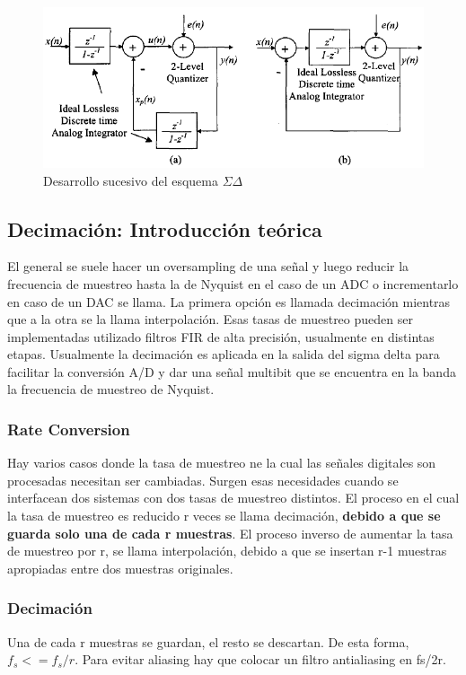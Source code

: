 \documentclass[assd_tp3_main.tex]{subfiles}
\begin{document}
\begin{figure}[H]
\centering
\includegraphics[width=0.6\linewidth]{images/ej4/sd_block_model.png}
\caption{Desarrollo sucesivo del esquema $\Sigma\Delta$ }
\label{fig:sd_block_model}
\end{figure}

\subsection{Decimación: Introducción teórica}
El general se suele hacer un oversampling de una señal y luego reducir la frecuencia de muestreo hasta la de Nyquist en el caso de un ADC o incrementarlo en caso de un DAC se llama. La primera opción es llamada decimación mientras que a la otra se la llama interpolación.
Esas tasas de muestreo pueden ser implementadas utilizado filtros FIR de alta precisión, usualmente en distintas etapas.
Usualmente la decimación es aplicada en la salida del sigma delta para facilitar la conversión A/D y dar una señal multibit que se encuentra en la banda la frecuencia de muestreo de Nyquist.
\subsubsection{Rate Conversion}
Hay varios casos donde la tasa de muestreo ne la cual las señales digitales son procesadas necesitan ser cambiadas. Surgen esas necesidades cuando se interfacean dos sistemas con dos tasas de muestreo distintos. El proceso en el cual  la tasa de muestreo es reducido r veces se llama decimación, \textbf{debido a que se guarda solo una de cada r muestras}.
El proceso inverso de aumentar la tasa de muestreo por r, se llama interpolación, debido a que se insertan r-1 muestras apropiadas entre dos muestras originales.
\subsubsection{Decimación}
Una de cada r muestras se guardan, el resto se descartan. 
De esta forma, $f_s<=f_s/r$. Para evitar aliasing hay que colocar un filtro antialiasing en fs/2r.
\end{document}
